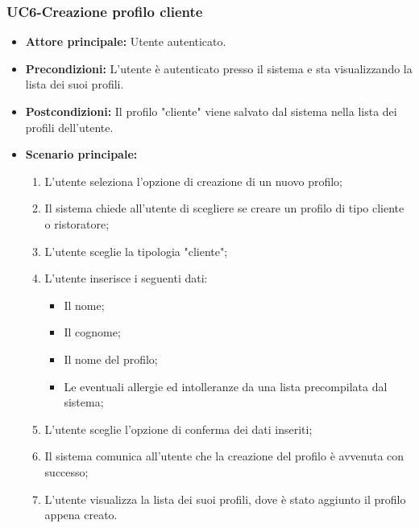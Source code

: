 \subsubsection{UC6-Creazione profilo cliente}
\begin{itemize}
    \item \textbf{Attore principale:} Utente autenticato.
    \item \textbf{Precondizioni:} L'utente è autenticato presso il sistema e sta visualizzando
    la lista dei suoi profili.
    \item \textbf{Postcondizioni:} Il profilo "cliente" viene salvato dal sistema nella lista dei profili
    dell'utente.
    \item \textbf{Scenario principale:}
    \begin{enumerate}
        \item L'utente seleziona l'opzione di creazione di un nuovo profilo;
        \item Il sistema chiede all'utente di scegliere se creare un profilo di tipo cliente
        o ristoratore;
        \item L'utente sceglie la tipologia "cliente";
        \item L'utente inserisce i seguenti dati:
        \begin{itemize}
            \item Il nome;
            \item Il cognome;
            \item Il nome del profilo;
            \item Le eventuali allergie ed intolleranze da una lista precompilata dal sistema;
        \end{itemize}
        \item L'utente sceglie l'opzione di conferma dei dati inseriti;
        \item Il sistema comunica all'utente che la creazione del profilo è avvenuta con successo;
        \item L'utente visualizza la lista dei suoi profili, dove è stato aggiunto il profilo appena creato.
    \end{enumerate}
\end{itemize}

